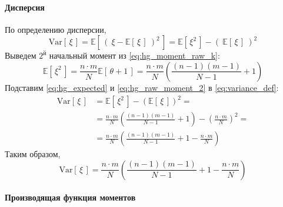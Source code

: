 \documentclass[
  russian,
  a4paper,
]{article}
\let\oldparagraph\paragraph
\renewcommand{\paragraph}[1]{\oldparagraph{#1}\mbox{}}
\begin{document}
\hypertarget{ux434ux438ux441ux43fux435ux440ux441ux438ux44f}{%
\paragraph{Дисперсия}\label{ux434ux438ux441ux43fux435ux440ux441ux438ux44f}}

По определению дисперсии,
\begin{equation}\mathrm{Var}\left[\, \xi \,\right] = \mathbb{E}\left[\, \left(\ \xi - \mathbb{E}\left[\, \xi \,\right]\ \right)^2 \,\right] = \mathbb{E}\left[\, \xi^2 \,\right] - \left(\ \mathbb{E}\left[\, \xi \,\right]\ \right)^2\label{eq:variance_def}\end{equation}
Выведем \(2^\text{й}\) начальный момент из \ref{eq:hg_moment_raw_k}:
\begin{equation}\mathbb{E}\left[\, \xi^2 \,\right]
= \frac{n \cdot m}{N}\mathbb{E}\left[\, \theta+1 \,\right]
= \frac{n \cdot m}{N}\left(\frac{(n-1)(m-1)}{N-1}+1\right)\label{eq:hg_raw_moment_2}\end{equation}
Подставим \ref{eq:hg_expected} и \ref{eq:hg_raw_moment_2} в
\ref{eq:variance_def}: \[\begin{aligned}
    \mathrm{Var}\left[\, \xi \,\right] &= \mathbb{E}\left[\, \xi^2 \,\right] - \left(\mathbb{E}\left[\, \xi \,\right]\right)^2 =\\
              &= \frac{n \cdot m}{N}\left(\frac{(n-1)(m-1)}{N-1}+1\right)
                    - \left(\frac{n \cdot m}{N}\right)^2=\\
              &= \frac{n \cdot m}{N}\left(\frac{(n-1)(m-1)}{N-1} + 1
                   - \frac{n \cdot m}{N}\right)
\end{aligned}\] Таким образом, \[\boxed{
    \mathrm{Var}\left[\, \xi \,\right] = \frac{n \cdot m}{N}\left(\frac{(n-1)(m-1)}{N-1} + 1 - \frac{n \cdot m}{N}\right)
}\]

\hypertarget{ux43fux440ux43eux438ux437ux432ux43eux434ux44fux449ux430ux44f-ux444ux443ux43dux43aux446ux438ux44f-ux43cux43eux43cux435ux43dux442ux43eux432}{%
\paragraph{Производящая функция
моментов}\label{ux43fux440ux43eux438ux437ux432ux43eux434ux44fux449ux430ux44f-ux444ux443ux43dux43aux446ux438ux44f-ux43cux43eux43cux435ux43dux442ux43eux432}}
\end{document}
